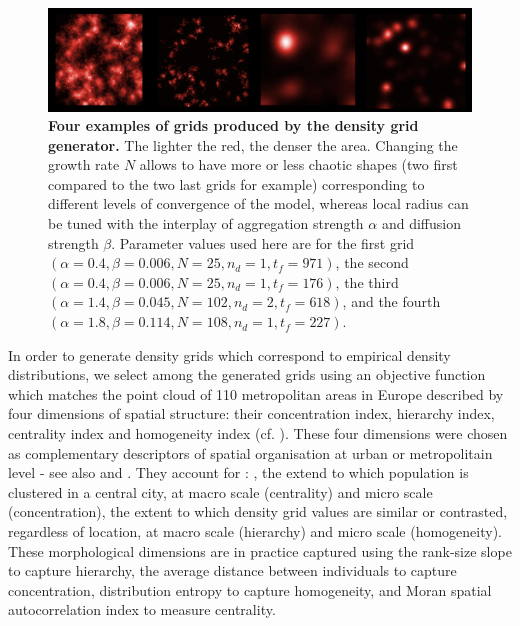 \documentclass{JASSS}
\begin{document}
\begin{figure}[!t]
\centering
	\includegraphics[width=\textwidth]{figures/Fig2.png}
 \caption{\textbf{Four examples of grids produced by the density grid generator.} The lighter the red, the denser the area. Changing the growth rate $N$ allows to have more or less chaotic shapes (two first compared to the two last grids for example) corresponding to different levels of convergence of the model, whereas local radius can be tuned with the interplay of aggregation strength $\alpha$ and diffusion strength $\beta$. Parameter values used here are for the first grid $(\alpha = 0.4,\beta=0.006, N = 25, n_d = 1, t_f = 971)$, the second $(\alpha = 0.4,\beta=0.006, N = 25, n_d = 1, t_f = 176)$, the third $(\alpha = 1.4,\beta=0.045, N = 102, n_d = 2, t_f = 618)$, and the fourth $(\alpha = 1.8,\beta=0.114, N = 108, n_d = 1, t_f = 227)$.}
\label{fig:spatialGen}
\end{figure} %


In order to generate density grids which correspond to empirical density distributions, we select among the generated grids using an objective function which matches the point cloud of 110 metropolitan areas in Europe described by four dimensions of spatial structure: their concentration index, hierarchy index, centrality index and homogeneity index (cf. \cite{LeNechet2015}). These four dimensions were chosen as complementary descriptors of spatial organisation at urban or metropolitain level - see also \cite{tsai2005quantifying} and \cite{schwarz2010urban}. They account for : , the extend to which population is clustered in a central city, at macro scale (centrality) and micro scale (concentration), the extent to which density grid values are similar or contrasted, regardless of location, at macro scale (hierarchy) and micro scale (homogeneity). These morphological dimensions are in practice captured using the rank-size slope to capture hierarchy, the average distance between individuals to capture concentration, distribution entropy to capture homogeneity, and Moran spatial autocorrelation index to measure centrality.
\end{document}
